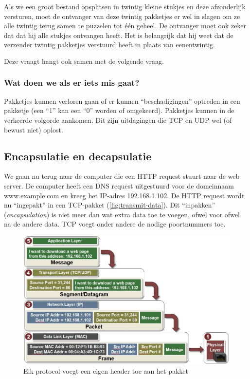 Als we een groot bestand opsplitsen in twintig kleine stukjes en deze afzonderlijk versturen, moet de ontvanger van deze twintig pakketjes er wel in slagen om ze alle twintig terug samen te puzzelen tot één geheel.
De ontvanger moet ook zeker dat dat hij alle stukjes ontvangen heeft.
Het is belangrijk dat hij weet dat de verzender twintig pakketjes verstuurd heeft in plaats van eenentwintig.

Deze vraagt hangt ook samen met de volgende vraag.

\subsubsection{Wat doen we als er iets mis gaat?}
Pakketjes kunnen verloren gaan of er kunnen ``beschadigingen'' optreden in een pakketje (een ``1'' kan een ``0'' worden of omgekeerd).
Pakketjes kunnen in de verkeerde volgorde aankomen.
Dit zijn uitdagingen die TCP en UDP wel (of bewust niet) oplost.




\subsection{Encapsulatie en decapsulatie}

We gaan nu terug naar de computer die een HTTP request stuurt naar de web server.
De computer heeft een DNS request uitgestuurd voor de domeinnaam www.example.com en kreeg het IP-adres 192.168.1.102.
De HTTP request wordt nu ``ingepakt'' in een TCP-pakket (\vref{fig:transmit-data}).
Dit ``inpakken'' (\emph{encapsulation}) is niet meer dan wat extra data toe te voegen, ofwel voor ofwel na de andere data.
TCP voegt onder andere de nodige poortnummers toe.


\begin{figure}
   \centering
   \includegraphics[width=\textwidth]{images/transmit_data.jpg}
   \caption{Elk protocol voegt een eigen header toe aan het pakket}
   \label{fig:transmit-data}
\end{figure}

